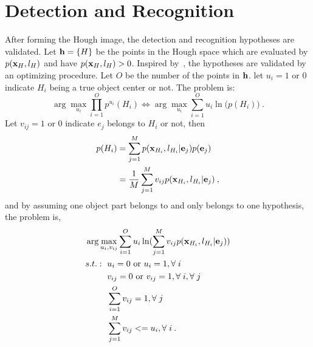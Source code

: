 \documentclass[10pt,twocolumn,letterpaper]{article}
\begin{document}
\section{Detection and Recognition}
After forming the Hough image, the detection and recognition hypotheses are validated. Let ${\bf{h}}=\{ H \}$ be the points in the Hough space which are evaluated by $p({\bf{x}}_{H},l_{H})$ and have $p({\bf{x}}_{H},l_{H})>0$.  Inspired by~\cite{ac9}, the hypotheses are validated by an optimizing procedure. Let $O$ be the number of the points in ${\bf{h}}$. let $u_i=1\mbox{ or } 0$ indicate $H_i$ being a true object center or not. The problem is:
\[
\arg \max\limits_{u_i} \prod\limits_{i = 1}^O { p^{u_i}({H_i})} \Longleftrightarrow\arg \max\limits_{u_i} \sum\limits_{i = 1}^O {{u_i}\ln (p({H_i})} )\:.
\]
Let $v_{ij}=1\mbox{ or } 0$ indicate $e_j$ belongs to $H_i$ or not, then
\[
\begin{aligned}
p(H_i)&=\sum\limits^M_{j=1} p({\bf{x}}_{H_i},l_{H_i}|{\bf{e}}_j)p({\bf{e}}_j)\\
&=\frac 1 M \sum\limits^M_{j=1} v_{ij} p({\bf{x}}_{H_i},l_{H_i}|{\bf{e}}_j)\:,
\end{aligned}
\]
and by assuming one object part belongs to and only belongs to one hypothesis, the problem is,
\[
\begin{aligned}
&\arg \max\limits_{u_i,v_{ij}} \sum\limits_{i = 1}^O {{u_i}\ln (\sum\limits^M_{j=1} v_{ij} p({\bf{x}}_{H_i},l_{H_i}|{\bf{e}}_j)} )\\
&
\begin{aligned}
    s.t.:\mbox{ }&u_i=0\mbox{ or }u_i=1,\forall\;i\\
    &v_{ij}=0\mbox{ or }v_{ij}=1,\forall\;i,\forall\;j\\
    &\sum\limits_{i = 1}^O {v_{ij}}=1,\forall\;j\\
    &\sum\limits_{j = 1}^M {v_{ij}}<=u_i,\forall\;i\:.
\end{aligned}
\end{aligned}
\]
\end{document}

